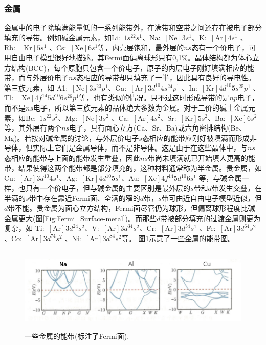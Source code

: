 \subsubsection{金属} 
金属中的电子除填满能量低的一系列能带外，在满带和空带之间还存在被电子部分填充的导带。例如碱金属元素，如Li:~$1s^22s^1$、Na:~$[\mathrm{Ne}] 3s^1$、K:~$[\mathrm{Ar}]4s^1$ 、Rb:~$[\mathrm{Kr}]5s^1$ 、Cs:~$[\mathrm{Xe}]6s^1$等，内壳层饱和，最外层的$ns$态有一个价电子，可用自由电子模型很好地描述。其Fermi面偏离球形只有0,1\%。晶体结构都为体心立方结构(BCC)，每个原胞只包含一个价电子，原子的内层电子刚好填满相应的能带，而与外层价电子$ns$态相应的导带却只填充了一半，因此具有良好的导电性。第三族元素，如 A1:~$[\mathrm{Ne}] 3s^23p^1$、Ga:~$[\mathrm{Ar}]3d^{10}4s^24p^1$ 、In:~$[\mathrm{Kr}]4d^{10}5s^25p^1$ 、Tl:~$[\mathrm{Xe}] 4f^{14}5d^{10}6s^26p^1$等，也有类似的情况。只不过这时形成导带的是$np$电子，而不是$ns$电子，所以第三族元素的晶体绝大多数为金属。对于二价的碱土金属元素，如Be:~$1s^22s^2$、Mg:~$[\mathrm{Ne}]3s^2$ 、Ca:~$[\mathrm{Ar}]4s^2$、Sr:~$[\mathrm{Kr}]5s^2$、Ba:~$[\mathrm{Xe}]6s^2$等，其外层有两个$ns$电子，具有面心立方(Ca、Sr、Ba)或六角密排结构(Be、Mg)。若按对碱金属的讨论，与外层价电子$s$态相应的能带应刚好被填满而形成非导体，但实际上它们是金属导体，而不是非导体。这是由于在这些晶体中，与$ns$态相应的能带与上面的能带发生重叠，因此$ns$带尚未填满就已开始填人更高的能带，结果使得这两个能带都是部分填充的，这种材料通常称为半金属。贵金属，如Cu:~$[\mathrm{Ar}] 3d^{10}4s^1$、Ag:~$[\mathrm{Kr}]4d^{10}5s^1 $、Au:~$[\mathrm{Xe}]4f^{14}5d^{10}6s^1$ 等，与碱金属一样，也只有一个价电子，但与碱金属的主要区别是最外层的$s$带和$d$带发生交叠，在半满的$s$带中存在靠近Fermi面、全满的窄的$d$带，$s$带可由近自由电子模型近似，但$d$带不能。贵金属为面心立方结构，Fermi面尽管仍为球形，但偏离球形程度比碱金属更大(图\ref{Fig:Fermi_Surface-metal})。而那些$d$带被部分填充的过渡金属则更为复杂，如 Ti:~$[\mathrm{Ar}]3d^24s^2$、V:~$[\mathrm{Ar}] 3d^34s^2$、Cr:~$[\mathrm{Ar}]3d^54s^1$ 、Fe:~$[\mathrm{Ar}] 3d^64s^2$、Co:~$[\mathrm{Ar}]3d^74s^2$ 、Ni:~$[\mathrm{Ar}] 3d^84s^2$等。%
图\ref{Fig:Band_structure-metal}示意了一些金属的能带图。
\begin{figure}[h!]
\centering
\vspace*{-0.10in}
\includegraphics[height=1.60in,width=4.70in,viewport=0 0 105 30,clip]{Figures/Band_Structure-metal.png}
\caption{\small \textrm{一些金属的能带(标注了Fermi面).}}%
\label{Fig:Band_structure-metal}
\end{figure}

